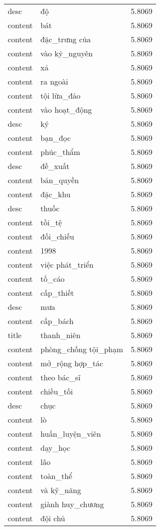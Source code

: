 \documentclass{article}
\begin{document}
\begin{tabular}{lll}
desc & độ & 5.8069\\
content & bát & 5.8069\\
content & đặc\_trưng của & 5.8069\\
content & vào kỷ\_nguyên & 5.8069\\
content & xả & 5.8069\\
content & ra ngoài & 5.8069\\
content & tội lừa\_đảo & 5.8069\\
content & vào hoạt\_động & 5.8069\\
desc & ký & 5.8069\\
content & bạn\_đọc & 5.8069\\
content & phúc\_thẩm & 5.8069\\
desc & đề\_xuất & 5.8069\\
content & bản\_quyền & 5.8069\\
content & đặc\_khu & 5.8069\\
desc & thuốc & 5.8069\\
content & tồi\_tệ & 5.8069\\
content & đối\_chiếu & 5.8069\\
content & 1998 & 5.8069\\
content & việc phát\_triển & 5.8069\\
content & tố\_cáo & 5.8069\\
content & cấp\_thiết & 5.8069\\
desc & mưa & 5.8069\\
content & cấp\_bách & 5.8069\\
title & thanh\_niên & 5.8069\\
content & phòng\_chống tội\_phạm & 5.8069\\
content & mở\_rộng hợp\_tác & 5.8069\\
content & theo bác\_sĩ & 5.8069\\
content & chiều\_tối & 5.8069\\
desc & chục & 5.8069\\
content & lò & 5.8069\\
content & huấn\_luyện\_viên & 5.8069\\
content & dạy\_học & 5.8069\\
content & lão & 5.8069\\
content & toàn\_thể & 5.8069\\
content & và kỹ\_năng & 5.8069\\
content & giành huy\_chương & 5.8069\\
content & đội chủ & 5.8069\\

\end{tabular}
\end{document}
